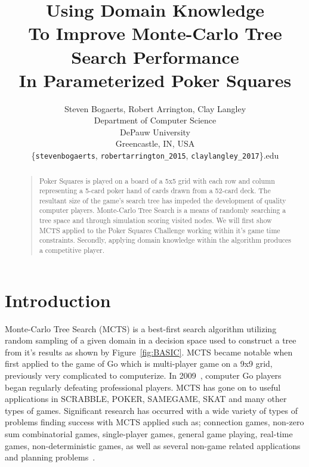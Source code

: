 \documentclass[letterpaper]{article}
\begin{document}
%
\title{Using Domain Knowledge\\To Improve Monte-Carlo Tree Search Performance\\In Parameterized Poker Squares}    %
\author{Steven Bogaerts, Robert Arrington, Clay Langley\\
Department of Computer Science\\
DePauw University\\
Greencastle, IN, USA\\
\{{\tt stevenbogaerts}, {\tt robertarrington\_2015}, {\tt claylangley\_2017}\}{\tt@depauw.edu}
}
\maketitle
\begin{abstract}
\begin{quote}
Poker Squares is played on a board of a 5x5 grid with each row and column representing a 5-card poker hand of cards drawn from a 52-card deck. The resultant size of the game's search tree has impeded the development of quality computer players. Monte-Carlo Tree Search is a means of randomly searching a tree space and through simulation scoring visited nodes. We will first show MCTS applied to the Poker Squares Challenge working within it's game time constraints. Secondly, applying domain knowledge within the algorithm produces a competitive player.
\end{quote}
\end{abstract}

\section{Introduction}
Monte-Carlo Tree Search (MCTS) is a best-first search algorithm utilizing random sampling of a given domain in a decision space used to construct a tree from it's results as shown by Figure~\ref{fig:BASIC}. MCTS became notable when first applied to the game of Go which is multi-player game on a 9x9 grid, previously very complicated to computerize. In 2009~\cite{chaslot2008monte}, computer Go players began regularly defeating professional players. MCTS has gone on to useful applications in SCRABBLE, POKER, SAMEGAME, SKAT and many other types of games. Significant research has occurred with a wide variety of types of problems finding success with MCTS applied such as; connection games, non-zero sum combinatorial games, single-player games, general game playing, real-time games, non-deterministic games, as well as several non-game related applications and planning problems~\cite{browne2010monte}.
\end{document}
